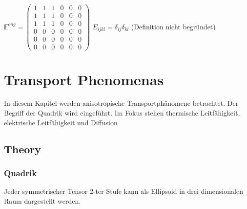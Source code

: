 \documentclass[a4paper]{scrartcl}
\begin{document}
$
\mathbb{E}^{eng}=
\begin{pmatrix}
1 & 1 & 1 & 0 & 0 & 0 \\ 
1 & 1 & 1 & 0 & 0 & 0 \\ 
1 & 1 & 1 & 0 & 0 & 0 \\ 
0 & 0 & 0 & 0 & 0 & 0 \\ 
0 & 0 & 0 & 0 & 0 & 0 \\ 
0 & 0 & 0 & 0 & 0 & 0
\end{pmatrix} 
$ $E_{ijkl} = \delta_{ij} \delta_{kl}$ (Definition nicht
begründet)

\section{Transport Phenomenas}
In diesem Kapitel werden anisotropische Transportphänomene betrachtet. Der
Begriff der Quadrik wird eingeführt. Im Fokus stehen thermische Leitfähigkeit,
elektrische Leitfähigkeit und Diffusion
\subsection{Theory}
\subsubsection{Quadrik}
Jeder symmetrischer Tensor 2-ter Stufe kann als Ellipsoid in drei dimensionalen
Raum dargestellt werden.
\end{document}
